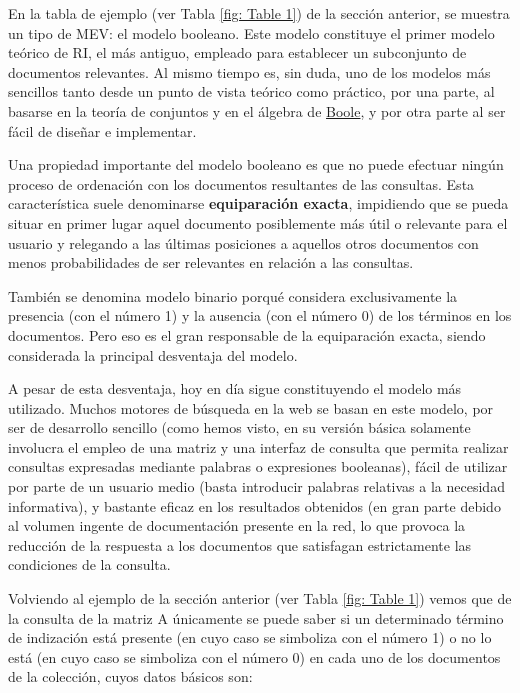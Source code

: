 \documentclass[titlepage]{article}
\begin{document}
En la tabla de ejemplo (ver Tabla \ref{fig: Table 1}) de la sección anterior, se muestra un tipo de MEV: el modelo booleano. Este modelo constituye el primer modelo teórico de RI, el más antiguo, empleado para establecer un subconjunto de documentos relevantes. Al mismo tiempo es, sin duda, uno de los modelos más sencillos tanto desde un punto de vista teórico como práctico, por una parte, al basarse en la teoría de conjuntos y en el álgebra de \href{https://es.wikipedia.org/wiki/\%C3\%81lgebra_de_Boole}{Boole}, y por otra parte al ser fácil de diseñar e implementar.

\newpage

Una propiedad importante del modelo booleano es que no puede efectuar ningún proceso de ordenación con los documentos resultantes de las consultas. Esta característica suele denominarse \textbf{equiparación exacta}, impidiendo que se pueda situar en primer lugar aquel documento posiblemente más útil o relevante para el usuario y relegando a las últimas posiciones a aquellos otros documentos con menos probabilidades de ser relevantes en relación a las consultas.

También se denomina modelo binario porqué considera exclusivamente la presencia (con el número 1) y la ausencia (con el número 0) de los términos en los documentos. Pero eso es el gran responsable de la equiparación exacta, siendo considerada la principal desventaja del modelo. 

A pesar de esta desventaja, hoy en día sigue constituyendo el modelo más utilizado. Muchos motores de búsqueda en la web se basan en este modelo, por ser de desarrollo sencillo (como hemos visto, en su versión básica solamente involucra el empleo de una matriz y una interfaz de consulta que permita realizar consultas expresadas mediante palabras o expresiones booleanas), fácil de utilizar por parte de un usuario medio (basta introducir palabras relativas a la necesidad informativa), y bastante eficaz en los resultados obtenidos (en gran parte debido al volumen ingente de documentación presente en la red, lo que provoca la reducción de la respuesta a los documentos que satisfagan estrictamente las condiciones de la consulta.

Volviendo al ejemplo de la sección anterior (ver Tabla \ref{fig: Table 1}) vemos que de la consulta de la matriz A únicamente se puede saber si un determinado término de indización está presente (en cuyo caso se simboliza con el número 1) o no lo está (en cuyo caso se simboliza con el número 0) en cada uno de los documentos de la colección, cuyos datos básicos son:
\end{document}
